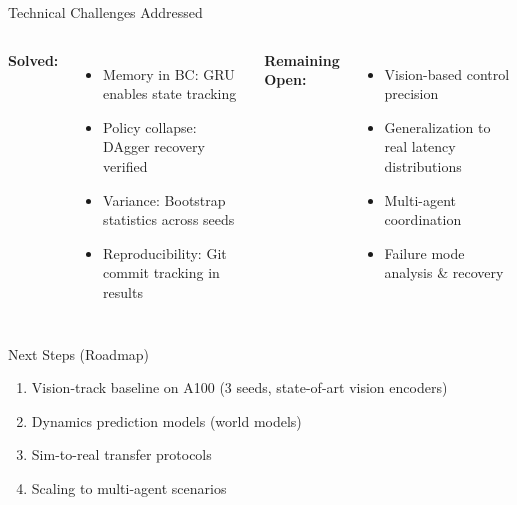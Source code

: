 \documentclass[10pt,aspectratio=16:9]{beamer}
\begin{document}
\begin{frame}{Technical Challenges Addressed}
  \begin{columns}
    \textbf{Solved:}
    \begin{itemize}
      \item Memory in BC: GRU enables state tracking
      \item Policy collapse: DAgger recovery verified
      \item Variance: Bootstrap statistics across seeds
      \item Reproducibility: Git commit tracking in results
    \end{itemize}

    \textbf{Remaining Open:}
    \begin{itemize}
      \item Vision-based control precision
      \item Generalization to real latency distributions
      \item Multi-agent coordination
      \item Failure mode analysis \& recovery
    \end{itemize}
  \end{columns}

  \vspace{1em}

  \begin{alertblock}{Next Steps (Roadmap)}
    \begin{enumerate}
      \item Vision-track baseline on A100 (3 seeds, state-of-art vision encoders)
      \item Dynamics prediction models (world models)
      \item Sim-to-real transfer protocols
      \item Scaling to multi-agent scenarios
    \end{enumerate}
  \end{alertblock}
\end{frame}
\end{document}
